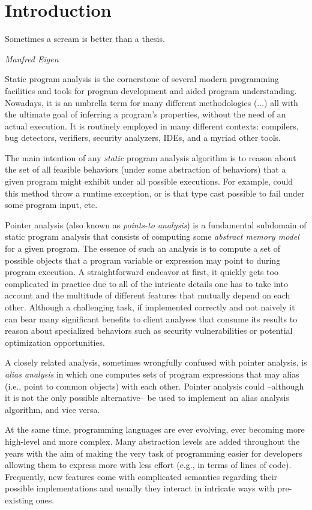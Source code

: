 \chapter{Introduction}\label{chapter:intro}

\epigraph{Sometimes a scream is better than a thesis.}{\textit{Manfred Eigen}}

Static program analysis is the cornerstone of several modern programming
facilities and tools for program development and aided program understanding.
Nowadays, it is an umbrella term for many different methodologies (...) all
with the ultimate goal of inferring a program's properties, without the need of
an actual execution. It is routinely employed in many different contexts:
compilers, bug detectors, verifiers, security analyzers, IDEs, and a myriad
other tools. 

The main intention of any \emph{static} program analysis algorithm is to reason
about the set of all feasible behaviors (under some abstraction of behaviors)
that a given program might exhibit under all possible executions. For example,
could this method throw a runtime exception, or is that type cast possible to
fail under some program input, etc.

Pointer analysis (also known as \emph{points-to analysis}) is a fundamental
subdomain of static program analysis that consists of computing some
\emph{abstract memory model} for a given program. The essence of such an
analysis is to compute a set of possible objects that a program variable or
expression may point to during program execution. A straightforward endeavor at
first, it quickly gets too complicated in practice due to all of the intricate
details one has to take into account and the multitude of different features
that mutually depend on each other. Although a challenging task, if implemented
correctly and not naively it can bear many significant benefits to client
analyses that consume its results to reason about specialized behaviors such as
security vulnerabilities or potential optimization opportunities.

A closely related analysis, sometimes wrongfully confused with pointer
analysis, is \emph{alias analysis} in which one computes sets of program
expressions that may alias (i.e., point to common objects) with each other.
Pointer analysis could --although it is not the only possible alternative-- be
used to implement an alias analysis algorithm, and vice versa.

At the same time, programming languages are ever evolving, ever becoming more
high-level and more complex. Many abstraction levels are added throughout the
years with the aim of making the very task of programming easier for developers
allowing them to express more with less effort (e.g., in terms of lines of
code). Frequently, new features come with complicated semantics regarding their
possible implementations and usually they interact in intricate ways with
pre-existing ones.

